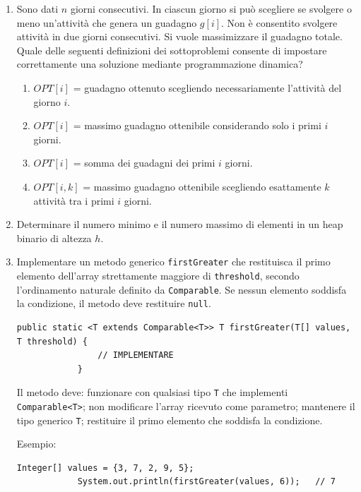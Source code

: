 \begin{enumerate}
		Esempio:
		\begin{lstlisting}[style=java]
			BankAccount a = new BankAccount(100);
			BankAccount b = new BankAccount();
			a.transferTo(b, 10);
			System.out.println(a.getBalance());   // 90
			System.out.println(b.getBalance());   // 10
		\end{lstlisting}
		
		\item Sono dati $n$ giorni consecutivi. In ciascun giorno si può scegliere se svolgere o meno un'attività che genera un guadagno $g[i]$. Non è consentito svolgere attività in due giorni consecutivi. Si vuole massimizzare il guadagno totale. Quale delle seguenti definizioni dei sottoproblemi consente di impostare correttamente una soluzione mediante programmazione dinamica?
		\begin{enumerate}[label=(\alph*)]
			\item $OPT[i]$ = guadagno ottenuto scegliendo necessariamente l'attività del giorno $i$.
			\item $OPT[i]$ = massimo guadagno ottenibile considerando solo i primi $i$ giorni.
			\item $OPT[i]$ = somma dei guadagni dei primi $i$ giorni.
			\item $OPT[i,k]$ = massimo guadagno ottenibile scegliendo esattamente $k$ attività tra i primi $i$ giorni.
		\end{enumerate}
		
		\item Determinare il numero minimo e il numero massimo di elementi in un heap binario di altezza $h$.
		
		\item Implementare un metodo generico \texttt{firstGreater} che restituisca il primo elemento dell'array strettamente maggiore di \texttt{threshold}, secondo l'ordinamento naturale definito da \texttt{Comparable}. Se nessun elemento soddisfa la condizione, il metodo deve restituire \texttt{null}.
		\begin{lstlisting}[style=java]
			public static <T extends Comparable<T>> T firstGreater(T[] values, T threshold) {
				// IMPLEMENTARE
			}
		\end{lstlisting}
		Il metodo deve: funzionare con qualsiasi tipo \texttt{T} che implementi \texttt{Comparable<T>}; non modificare l'array ricevuto come parametro; mantenere il tipo generico \texttt{T}; restituire il primo elemento che soddisfa la condizione.
		
		Esempio:
		\begin{lstlisting}[style=java]
			Integer[] values = {3, 7, 2, 9, 5};
			System.out.println(firstGreater(values, 6));   // 7
		\end{lstlisting}
		

\end{enumerate}
